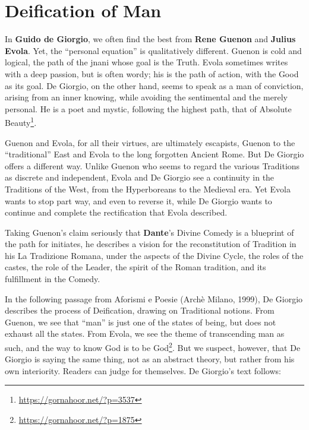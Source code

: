 \section{Deification of Man}

In \textbf{Guido de Giorgio}, we often find the best from \textbf{Rene Guenon} and \textbf{Julius Evola}. Yet, the ``personal equation'' is qualitatively different. Guenon is cold and logical, the path of the jnani whose goal is the Truth. Evola sometimes writes with a deep passion, but is often wordy; his is the path of action, with the Good as its goal. De Giorgio, on the other hand, seems to speak as a man of conviction, arising from an inner knowing, while avoiding the sentimental and the merely personal. He is a poet and mystic, following the highest path, that of Absolute Beauty\footnote{\url{https://gornahoor.net/?p=3537}}.

Guenon and Evola, for all their virtues, are ultimately escapists, Guenon to the ``traditional'' East and Evola to the long forgotten Ancient Rome. But De Giorgio offers a different way. Unlike Guenon who seems to regard the various Traditions as discrete and independent, Evola and De Giorgio see a continuity in the Traditions of the West, from the Hyperboreans to the Medieval era. Yet Evola wants to stop part way, and even to reverse it, while De Giorgio wants to continue and complete the rectification that Evola described.

Taking Guenon's claim seriously that \textbf{Dante}'s Divine Comedy is a blueprint of the path for initiates, he describes a vision for the reconstitution of Tradition in his La Tradizione Romana, under the aspects of the Divine Cycle, the roles of the castes, the role of the Leader, the spirit of the Roman tradition, and its fulfillment in the Comedy.

In the following passage from Aforismi e Poesie (Archè Milano, 1999), De Giorgio describes the process of Deification, drawing on Traditional notions. From Guenon, we see that ``man'' is just one of the states of being, but does not exhaust all the states. From Evola, we see the theme of transcending man as such, and the way to know God is to be God\footnote{\url{https://gornahoor.net/?p=1875}}. But we suspect, however, that De Giorgio is saying the same thing, not as an abstract theory, but rather from his own interiority. Readers can judge for themselves. De Giorgio's text follows:

